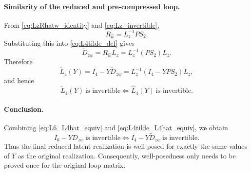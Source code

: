 \documentclass[11pt]{article}
\begin{document}
\paragraph{Similarity of the reduced and pre-compressed loop.}
From \eqref{eq:LzRhatw_identity} and \eqref{eq:Lz_invertible},
\[
R_{\hat w}=L_z^{-1}PS_2.
\]
Substituting this into \eqref{eq:L4tilde_def} gives
\begin{equation}
    \tilde D_{zw}
    = R_{\hat w}L_z
    = L_z^{-1}(PS_2)L_z.
    \label{eq:Dzwtilde_similarity}
\end{equation}
Therefore
\begin{equation}
    \tilde L_4(Y)
    = I_4 - Y\tilde D_{zw}
    = L_z^{-1}(I_4-YPS_2)L_z,
    \label{eq:L4tilde_similarity}
\end{equation}
and hence
\begin{equation}
    \tilde L_4(Y)\ \text{is invertible}
    \iff
    \hat L_4(Y)\ \text{is invertible}.
    \label{eq:L4tilde_L4hat_equiv}
\end{equation}

\paragraph{Conclusion.}
Combining \eqref{eq:L6_L4hat_equiv} and \eqref{eq:L4tilde_L4hat_equiv}, we obtain
\begin{equation}
    I_6-YD_{zw}\ \text{is invertible}
    \iff
    I_4-Y\tilde D_{zw}\ \text{is invertible}.
\end{equation}
Thus the final reduced latent realization is well posed for exactly the same
values of $Y$ as the original realization. Consequently, well-posedness only
needs to be proved once for the original loop matrix.
\end{document}
